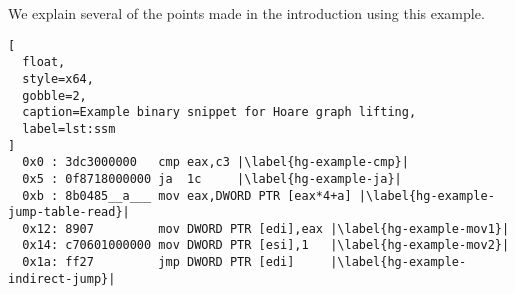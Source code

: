 We explain several of the points made in the introduction using this example.

\begin{lstlisting}[
  float,
  style=x64,
  gobble=2,
  caption=Example binary snippet for Hoare graph lifting,
  label=lst:ssm
]
  0x0 : 3dc3000000   cmp eax,c3 |\label{hg-example-cmp}|
  0x5 : 0f8718000000 ja  1c     |\label{hg-example-ja}|
  0xb : 8b0485__a___ mov eax,DWORD PTR [eax*4+a] |\label{hg-example-jump-table-read}|
  0x12: 8907         mov DWORD PTR [edi],eax |\label{hg-example-mov1}|
  0x14: c70601000000 mov DWORD PTR [esi],1   |\label{hg-example-mov2}|
  0x1a: ff27         jmp DWORD PTR [edi]     |\label{hg-example-indirect-jump}|
\end{lstlisting}
